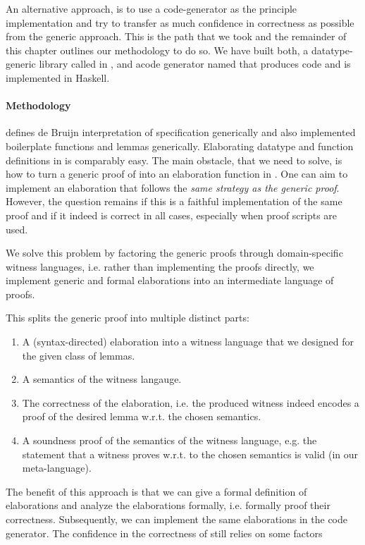 An alternative approach, is to use a code-generator as the principle
implementation and try to transfer as much confidence in correctness as possible
from the generic approach. This is the path that we took and the remainder of
this chapter outlines our methodology to do so. We have built both, a
datatype-generic library called \Loom in \Coq, and acode generator named \Needle
that produces \Coq code and is implemented in Haskell.


\paragraph{Methodology}
\Loom defines de Bruijn interpretation of \Knot specification generically and
also implemented boilerplate functions and lemmas generically. Elaborating
datatype and function definitions in \Needle is comparably easy. The main
obstacle, that we need to solve, is how to turn a generic proof of \Loom into an
elaboration function in \Needle. One can aim to implement an elaboration that
follows the \emph{same strategy as the generic proof}. However, the question
remains if this is a faithful implementation of the same proof and if it indeed
is correct in all cases, especially when proof scripts are used.

We solve this problem by factoring the generic proofs through domain-specific
witness languages, i.e. rather than implementing the proofs directly, we
implement generic and formal elaborations into an intermediate language of
proofs.

This splits the generic proof into multiple distinct parts:
\begin{enumerate}
\item A (syntax-directed) elaboration into a witness language that we designed
  for the given class of lemmas.
\item A semantics of the witness langauge.
\item The correctness of the elaboration, i.e. the produced witness indeed
  encodes a proof of the desired lemma w.r.t. the chosen semantics.
\item A soundness proof of the semantics of the witness language, e.g. the
  statement that a witness proves w.r.t. to the chosen semantics is valid (in
  our meta-language).
\end{enumerate}

The benefit of this approach is that we can give a formal definition of
elaborations and analyze the elaborations formally, i.e. formally proof their
correctness. Subsequently, we can implement the same elaborations in the code
generator. The confidence in the correctness of \Needle still relies on some
factors

